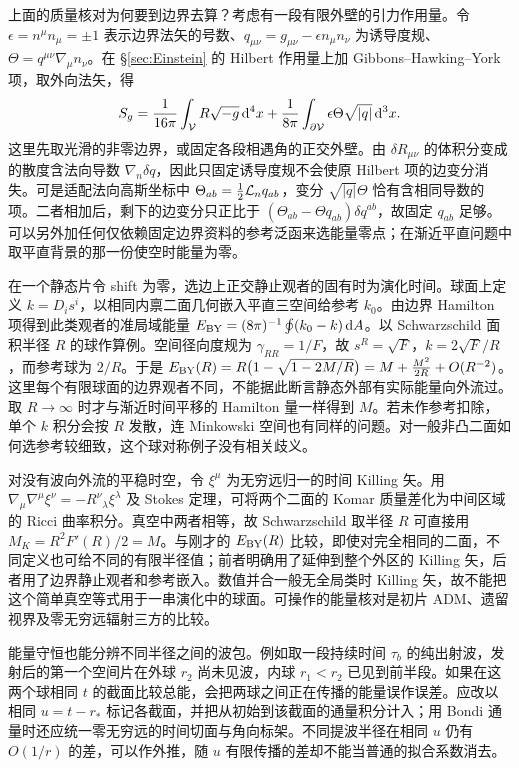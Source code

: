 上面的质量核对为何要到边界去算？考虑有一段有限外壁的引力作用量。令 $\epsilon=n^\mu n_\mu=\pm1$ 表示边界法矢的号数、$q_{\mu\nu}=g_{\mu\nu}-\epsilon n_\mu n_\nu$ 为诱导度规、$\Theta=q^{\mu\nu}\nabla_\mu n_\nu$。在 \S\ref{sec:Einstein} 的 Hilbert 作用量上加 Gibbons--Hawking--York 项，取外向法矢，得
\[
 S_g=\frac{1}{16\pi}\int_{\cal V} R\sqrt{-g}\,\dd^4x+
        \frac{1}{8\pi}\int_{\partial{\cal V}}\epsilon\Theta
                                   \sqrt{|q|}\,\dd^3x .
\]
这里先取光滑的非零边界，或固定各段相遇角的正交外壁。由 $\delta R_{\mu\nu}$ 的体积分变成的散度含法向导数 $\nabla_n\delta q$，因此只固定诱导度规不会使原 Hilbert 项的边变分消失。可是适配法向高斯坐标中 $\Theta_{ab}=\tfrac12{\cal L}_nq_{ab}$，变分 $\sqrt{|q|}\Theta$ 恰有含相同导数的项。二者相加后，剩下的边变分只正比于 $(\Theta_{ab}-\Theta q_{ab})\delta q^{ab}$，故固定 $q_{ab}$ 足够。可以另外加任何仅依赖固定边界资料的参考泛函来选能量零点；在渐近平直问题中取平直背景的那一份使空时能量为零。

在一个静态片令 shift 为零，选边上正交静止观者的固有时为演化时间。球面上定义 $k=D_i s^i$，以相同内禀二面几何嵌入平直三空间给参考 $k_0$。由边界 Hamilton 项得到此类观者的准局域能量 $E_{\rm BY}=(8\pi)^{-1}\oint(k_0-k)\,\dd A$。以 Schwarzschild 面积半径 $R$ 的球作算例。空间径向度规为 $\gamma_{RR}=1/F$，故 $s^R=\sqrt F$，$k=2\sqrt F/R$，而参考球为 $2/R$。于是 $E_{\rm BY}(R)=R\big(1-\sqrt{1-2M/R}\big) =M+\frac{M^2}{2R}+O(R^{-2})$。这里每个有限球面的边界观者不同，不能据此断言静态外部有实际能量向外流过。取 $R\to\infty$ 时才与渐近时间平移的 Hamilton 量一样得到 $M$。若未作参考扣除，单个 $k$ 积分会按 $R$ 发散，连 Minkowski 空间也有同样的问题。对一般非凸二面如何选参考较细致，这个球对称例子没有相关歧义。

对没有波向外流的平稳时空，令 $\xi^\mu$ 为无穷远归一的时间 Killing 矢。用 $\nabla_\mu\nabla^\mu\xi^\nu=-R^\nu{}_\lambda\xi^\lambda$ 及 Stokes 定理，可将两个二面的 Komar 质量差化为中间区域的 Ricci 曲率积分。真空中两者相等，故 Schwarzschild 取半径 $R$ 可直接用 $M_K=R^2 F'(R)/2=M$。与刚才的 $E_{\rm BY}(R)$ 比较，即使对完全相同的二面，不同定义也可给不同的有限半径值；前者明确用了延伸到整个外区的 Killing 矢，后者用了边界静止观者和参考嵌入。数值并合一般无全局类时 Killing 矢，故不能把这个简单真空等式用于一串演化中的球面。可操作的能量核对是初片 ADM、遗留视界及零无穷远辐射三方的比较。

能量守恒也能分辨不同半径之间的波包。例如取一段持续时间 $\tau_b$ 的纯出射波，发射后的第一个空间片在外球 $r_2$ 尚未见波，内球 $r_1<r_2$ 已见到前半段。如果在这两个球相同 $t$ 的截面比较总能，会把两球之间正在传播的能量误作误差。应改以相同 $u=t-r_*$ 标记各截面，并把从初始到该截面的通量积分计入；用 Bondi 通量时还应统一零无穷远的时间切面与角向标架。不同提波半径在相同 $u$ 仍有 $O(1/r)$ 的差，可以作外推，随 $u$ 有限传播的差却不能当普通的拟合系数消去。

